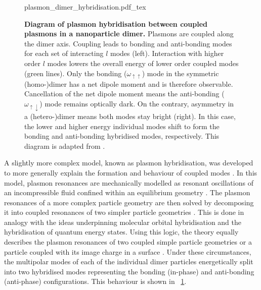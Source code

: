 \documentclass{article}
\begin{document}
\begin{figure}[bt]
\centering
\fontsize{10pt}{1em}\selectfont
\def\svgwidth{0.98\textwidth}
{plasmon_dimer_hybridisation.pdf_tex}
\caption[Diagram of plasmon hybridisation between coupled plasmons in a nanoparticle dimer]{\textbf{Diagram of plasmon hybridisation between coupled plasmons in a nanoparticle dimer.} Plasmons are coupled along the dimer axis. Coupling leads to bonding and anti-bonding modes for each set of interacting $l$ modes (left). Interaction with higher order $l$ modes lowers the overall energy of lower order coupled modes (green lines). Only the bonding ($\omega_{\uparrow\uparrow}$) mode in the symmetric (homo-)dimer has a net dipole moment and is therefore observable. Cancellation of the net dipole moment means the anti-bonding ($\omega_{\uparrow\downarrow}$) mode remains optically dark. On the contrary, asymmetry in a (hetero-)dimer means both modes stay bright (right). In this case, the lower and higher energy individual modes shift to form the bonding and anti-bonding hybridised modes, respectively. This diagram is adapted from \cite{nordlander2004}.}
\label{fig:plasmon_hybridisation}
\end{figure}

A slightly more complex model, known as plasmon hybridisation, was developed to more generally explain the formation and behaviour of coupled modes \cite{prodan2003, prodan2004, nordlander2004}. In this model, plasmon resonances are mechanically modelled as resonant oscillations of an incompressible fluid confined within an equilibrium geometry \cite{prodan2004}. The plasmon resonances of a more complex particle geometry are then solved by decomposing it into coupled resonances of two simpler particle geometries \cite{prodan2003, prodan2004}. This is done in analogy with the ideas underpinning molecular orbital hybridisation and the hybridisation of quantum energy states. Using this logic, the theory equally describes the plasmon resonances of two coupled simple particle geometries \cite{nordlander2004} or a particle coupled with its image charge in a surface \cite{nordlander2004a}. Under these circumstances, the multipolar modes of each of the individual dimer particles energetically split into two hybridised modes representing the bonding (in-phase) and anti-bonding (anti-phase) configurations. This behaviour is shown in \figurename~\ref{fig:plasmon_hybridisation}.
\end{document}
